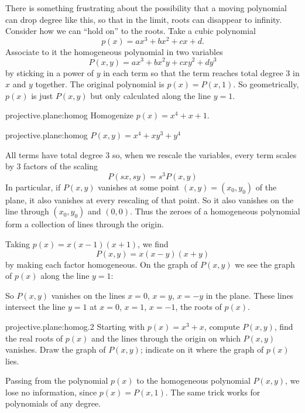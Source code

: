 There is something frustrating about the possibility that a moving polynomial can drop degree like this, so that in the limit, roots can disappear to infinity.
Consider how we can ``hold on'' to the roots.
Take a cubic polynomial
\[
p(x)=ax^3+bx^2+cx+d.
\]
Associate to it the homogeneous polynomial in two variables
\[
P(x,y)=ax^3+bx^2y+cxy^2+dy^3
\]
by sticking in a power of \(y\) in each term so that the term reaches total degree \(3\) in \(x\) and \(y\) together.
The original polynomial is \(p(x)=P(x,1)\).
So geometrically, \(p(x)\) is just \(P(x,y)\) but only calculated along the line \(y=1\).
\begin{problem}{projective.plane:homog}
Homogenize \(p(x)=x^4+x+1\).
\end{problem}
\begin{answer}{projective.plane:homog}
\(P(x,y)=x^4+xy^3+y^4\)
\end{answer}
All terms have total degree \(3\) so, when we rescale the variables, every term scales by \(3\) factors of the scaling
\[
P(sx,sy)=s^3P(x,y)
\]
In particular, if \(P(x,y)\) vanishes at some point \((x,y)=(x_0,y_0)\) of the plane, it also vanishes at every rescaling of that point.
So it also vanishes on the line through \((x_0,y_0)\) and \((0,0)\).
Thus the zeroes of a homogeneous polynomial form a collection of lines through the origin.
\begin{example}
Taking \(p(x)=x(x-1)(x+1)\), we find
\[
P(x,y)=x(x-y)(x+y)
\]
by making each factor homogeneous.
On the graph of \(P(x,y)\) we see the graph of \(p(x)\) along the line \(y=1\):
\begin{center}

\end{center}
So \(P(x,y)\) vanishes on the lines \(x=0\), \(x=y\), \(x=-y\) in the plane.
These lines intersect the line \(y=1\) at \(x=0\), \(x=1\), \(x=-1\), the roots of \(p(x)\).
\begin{center}

\end{center}
\end{example}
\begin{problem}{projective.plane:homog.2}
Starting with \(p(x)=x^3+x\), compute \(P(x,y)\), find the real roots of \(p(x)\) and the lines through the origin on which \(P(x,y)\) vanishes.
Draw the graph of \(P(x,y)\); indicate on it where the graph of \(p(x)\) lies.
\end{problem}
Passing from the polynomial \(p(x)\) to the homogeneous polynomial \(P(x,y)\), we lose no information, since \(p(x)=P(x,1)\).
The same trick works for polynomials of any degree.

